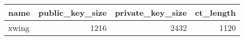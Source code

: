 \begin{tabular}{lrrr}
\toprule
name & public_key_size & private_key_size & ct_length \\
\midrule
xwing & 1216 & 2432 & 1120 \\
\bottomrule
\end{tabular}
